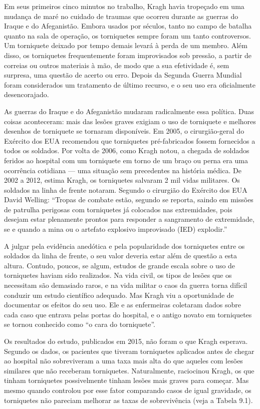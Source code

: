 \documentclass[11pt,a5paper,twoside]{book}
\begin{document}
Em seus primeiros cinco minutos no trabalho, Kragh havia tropeçado em uma mudança de maré no cuidado de traumas que ocorreu durante as guerras do Iraque e do Afeganistão. Embora usados por séculos, tanto no campo de batalha quanto na sala de operação, os torniquetes sempre foram um tanto controversos. Um torniquete deixado por tempo demais levará à perda de um membro. Além disso, os torniquetes frequentemente foram improvisados sob pressão, a partir de correias ou outros materiais à mão, de modo que a sua efetividade é, sem surpresa, uma questão de acerto ou erro. Depois da Segunda Guerra Mundial foram considerados um tratamento de último recurso, e o seu uso era oficialmente desencorajado.

As guerras do Iraque e do Afeganistão mudaram radicalmente essa política. Duas coisas aconteceram: mais das lesões graves exigiam o uso de torniquete e melhores desenhos de torniquete se tornaram disponíveis. Em 2005, o cirurgião-geral do Exército dos EUA recomendou que torniquetes pré-fabricados fossem fornecidos a todos os soldados. Por volta de 2006, como Kragh notou, a chegada de soldados feridos ao hospital com um torniquete em torno de um braço ou perna era uma ocorrência cotidiana — uma situação sem precedentes na história médica. De 2002 a 2012, estima Kragh, os torniquetes salvaram 2 mil vidas militares. Os soldados na linha de frente notaram. Segundo o cirurgião do Exército dos EUA David Welling: “Tropas de combate estão, segundo se reporta, saindo em missões de patrulha perigosas com torniquetes já colocados nas extremidades, pois desejam estar plenamente prontos para responder a sangramento de extremidade, se e quando a mina ou o artefato explosivo improvisado (IED) explodir.”

A julgar pela evidência anedótica e pela popularidade dos torniquetes entre os soldados da linha de frente, o seu valor deveria estar além de questão a esta altura. Contudo, poucos, se algum, estudos de grande escala sobre o uso de torniquetes haviam sido realizados. Na vida civil, os tipos de lesões que os necessitam são demasiado raros, e na vida militar o caos da guerra torna difícil conduzir um estudo científico adequado. Mas Kragh viu a oportunidade de documentar os efeitos do seu uso. Ele e as enfermeiras coletaram dados sobre cada caso que entrava pelas portas do hospital, e o antigo novato em torniquetes se tornou conhecido como “o cara do torniquete”.

Os resultados do estudo, publicados em 2015, não foram o que Kragh esperava. Segundo os dados, os pacientes que tiveram torniquetes aplicados antes de chegar ao hospital não sobreviveram a uma taxa mais alta do que aqueles com lesões similares que não receberam torniquetes. Naturalmente, raciocinou Kragh, os que tinham torniquetes possivelmente tinham lesões mais graves para começar. Mas mesmo quando controlou por esse fator comparando casos de igual gravidade, os torniquetes não pareciam melhorar as taxas de sobrevivência (veja a Tabela 9.1).
\end{document}
